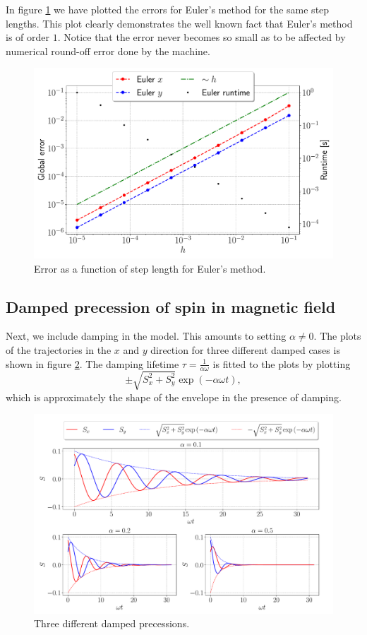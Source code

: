 In figure \ref{fig:err_euler} we have plotted the errors for Euler's method for the same step lengths. This plot clearly demonstrates the well known fact that Euler's method is of order $1$. Notice that the error never becomes so small as to be affected by numerical round-off error done by the machine.

\begin{figure}[htb]
	\centering
	\includegraphics[width =0.8\columnwidth]{../fig/err_euler.pdf}
	\caption{Error as a function of step length for Euler's method.}
	\label{fig:err_euler}
\end{figure}

\subsection{Damped precession of spin in magnetic field}

Next, we include damping in the model. This amounts to setting $\alpha \neq 0$. The plots of the trajectories in the $x$ and $y$ direction for three different damped cases is shown in figure \ref{fig:damped}. The damping lifetime $\tau =  \frac{1}{\alpha \omega}$ is fitted to the plots by plotting 
\[
	\pm \sqrt{S_x^2 + S_y^2} \exp{\left(-\alpha \omega t\right)},
\]
which is approximately the shape of the envelope in the presence of damping.  

\begin{figure}[htb]
	\centering
	\includegraphics[width=\columnwidth]{../fig/damped_precession.pdf}
	\caption{Three different damped precessions.}
	\label{fig:damped}
\end{figure}